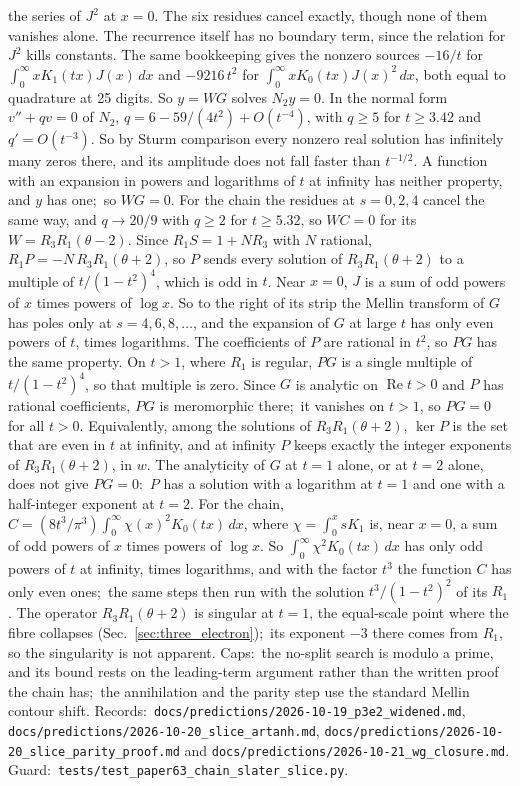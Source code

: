 \documentclass[aps,pra,twocolumn,superscriptaddress,longbibliography]{revtex4-2}
\begin{document}
the series of $J^2$ at $x=0$.  The six residues cancel exactly, though
none of them vanishes alone.  The recurrence itself has no boundary term, since the
relation for $J^2$ kills constants.  The same bookkeeping gives the nonzero
sources $-16/t$ for $\int_0^\infty xK_1(tx)J(x)\,dx$ and $-9216\,t^2$ for
$\int_0^\infty xK_0(tx)J(x)^2\,dx$, both equal to quadrature at 25 digits.
So $y=WG$ solves $N_2y=0$.  In the normal form $v''+qv=0$ of $N_2$,
$q=6-59/(4t^2)+O(t^{-4})$, with $q\ge5$ for $t\ge3.42$ and $q'=O(t^{-3})$.
So by Sturm comparison every nonzero real solution has infinitely many zeros
there, and its amplitude does not fall faster than $t^{-1/2}$.  A function
with an expansion in powers and logarithms of $t$ at infinity has neither
property, and $y$ has one;\ so $WG=0$.  For the chain the residues at
$s=0,2,4$ cancel the same way, and $q\to20/9$ with $q\ge2$ for $t\ge5.32$,
so $WC=0$ for its $W=R_3R_1(\theta-2)$.  Since $R_1S=1+NR_3$ with $N$ rational, $R_1P=-N\,R_3R_1(\theta+2)$, so
$P$ sends every solution of $R_3R_1(\theta+2)$ to a multiple of
$t/(1-t^2)^4$, which is odd in $t$.  Near $x=0$, $J$ is a sum of odd powers
of $x$ times powers of $\log x$.  So to the right of its strip the Mellin
transform of $G$ has poles only at $s=4,6,8,\dots$, and the expansion of $G$
at large $t$ has only even powers of $t$, times logarithms.  The
coefficients of $P$ are rational in $t^2$, so $PG$ has the same property.
On $t>1$, where $R_1$ is regular, $PG$ is a single multiple of
$t/(1-t^2)^4$, so that multiple is zero.  Since $G$ is analytic on
$\operatorname{Re}t>0$ and $P$ has rational coefficients, $PG$ is
meromorphic there;\ it vanishes on $t>1$, so $PG=0$ for all $t>0$.
Equivalently, among the solutions of $R_3R_1(\theta+2)$, $\ker P$ is the
set that are even in $t$ at infinity, and at infinity $P$ keeps exactly the
integer exponents of $R_3R_1(\theta+2)$, in $w$.  The analyticity of $G$
at $t=1$ alone, or at $t=2$ alone, does not give $PG=0$:\ $P$ has a solution
with a logarithm at $t=1$ and one with a half-integer exponent at $t=2$.
For the chain, $C=(8t^3/\pi^3)\int_0^\infty\chi(x)^2K_0(tx)\,dx$, where
$\chi=\int_0^x sK_1$ is, near $x=0$, a sum of odd powers of $x$ times powers
of $\log x$.  So $\int_0^\infty\chi^2K_0(tx)\,dx$ has only odd powers of $t$
at infinity, times logarithms, and with the factor $t^3$ the function $C$
has only even ones;\ the same steps then run with the solution
$t^3/(1-t^2)^2$ of its $R_1$.  The operator $R_3R_1(\theta+2)$ is singular at $t=1$, the equal-scale point where
the fibre collapses (Sec.~\ref{sec:three_electron});\ its exponent $-3$
there comes from $R_1$, so the singularity is not apparent.  Caps:\ the
no-split search is modulo a prime, and its bound rests on the leading-term
argument rather than the written proof the chain has;\ the annihilation
and the parity step use the standard Mellin contour shift.  Records:\
\texttt{docs/predictions/2026-10-19\_p3e2\_widened.md},
\texttt{docs/predictions/2026-10-20\_slice\_artanh.md},
\texttt{docs/predictions/2026-10-20\_slice\_parity\_proof.md} and
\texttt{docs/predictions/2026-10-21\_wg\_closure.md}.  Guard:\
\texttt{tests/test\_paper63\_chain\_slater\_slice.py}.
\end{document}
